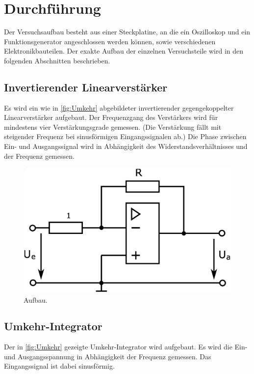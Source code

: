 \section{Durchführung}
Der Versuchsaufbau besteht aus einer Steckplatine, an die ein Oszilloskop und ein Funktionsgenerator angeschlossen werden können, sowie verschiedenen Elektronikbauteilen. Der exakte Aufbau der einzelnen Versuchsteile wird in den folgenden Abschnitten beschrieben.


\subsection{Invertierender Linearverstärker}
Es wird ein wie in \autoref{fig:Umkehr} abgebildeter invertierender gegengekoppelter Linearverstärker aufgebaut. Der Frequenzgang des Verstärkers wird für mindestens vier Verstärkungsgrade gemessen. (Die Verstärkung fällt mit steigender Frequenz bei sinusförmigen Eingangssignalen ab.) 
Die Phase zwischen Ein- und Ausgangssignal wird in Abhängigkeit des Widerstandsverhältnisses und der Frequenz gemessen.

\begin{figure}
    \centering
    \includegraphics[width=0.7\linewidth]{./figures/1_InvLinear.png}
    \caption{Aufbau. \cite{Anleitung}}
    \label{fig:InvLinear}
\end{figure}


\subsection{Umkehr-Integrator}
\label{sec:Umkehr}
Der in \autoref{fig:Umkehr} gezeigte Umkehr-Integrator wird aufgebaut.
Es wird die Ein- und Ausgangsspannung in Abhängigkeit der Frequenz gemessen. Das Eingangssignal ist dabei sinusförmig.

